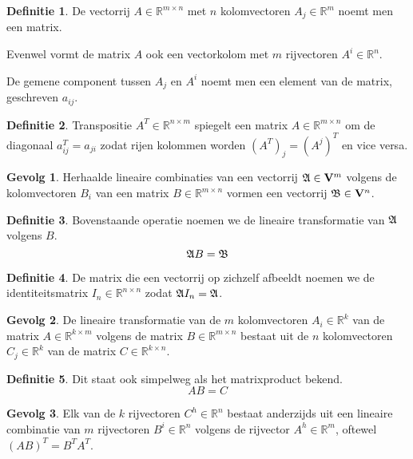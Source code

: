 \documentclass{amsart}
\theoremstyle{definition}
\newtheorem{dfn}{Definitie}[section]
\newtheorem{csq}{Gevolg}[section]
\newcommand{\realnums}{\mathbb{R}}
\newcommand{\realn}[1][n]{\realnums^{#1}}
\newcommand{\realmx}[2][n]{\realn[#2 \times #1]}
\newcommand{\realnxn}{\realmx{n}}
\newcommand{\realmxn}{\realmx{m}}
\newcommand{\vecspace}[1][v]{\mathrm{\mathbf{\MakeUppercase#1}}}
\newcommand{\vecspacen}[1][n]{\vecspace^#1}
\newcommand{\vecrow}[1][a]{\mathfrak{\MakeUppercase{#1}}}
\begin{document}
\begin{dfn}
	De vectorrij $A \in \realn[m \times n]$ met $n$ kolomvectoren $A_{j} \in \realn[m]$ noemt men een matrix.

	Evenwel vormt de matrix $A$ ook een vectorkolom met $m$ rijvectoren $A^i \in \realn$.

	De gemene component tussen $A_j$ en $A^i$ noemt men een element van de matrix, geschreven $a_{ij}$.
\end{dfn}

\begin{dfn}
	Transpositie $A^T \in \realmx[m]{n}$ spiegelt een matrix $A \in \realmxn$ om de diagonaal $a^T_{ij} = a_{ji}$ zodat rijen kolommen worden $(A^T)_j = (A^j)^T$ en vice versa.
\end{dfn}

\begin{csq}
	Herhaalde lineaire combinaties van een vectorrij $\vecrow \in \vecspacen[m]$ volgens de kolomvectoren $B_i$ van een matrix $B \in \realmxn$ vormen een vectorrij $\vecrow[b] \in \vecspacen$.
\end{csq}

\begin{dfn}
	Bovenstaande operatie noemen we de lineaire transformatie van $\vecrow$ volgens $B$.
	\begin{equation*}
		\vecrow B = \vecrow[b]
	\end{equation*}
\end{dfn}

\begin{dfn}
	De matrix die een vectorrij op zichzelf afbeeldt noemen we de identiteitsmatrix $I_n \in \realnxn$ zodat $\vecrow I_n = \vecrow$.
\end{dfn}

\begin{csq}
	De lineaire transformatie van de $m$ kolomvectoren $A_i \in \realn[k]$ van de matrix $A \in \realmx[m]{k}$ volgens de matrix $B \in \realmxn$ bestaat uit de $n$ kolomvectoren $C_j \in \realn[k]$ van de matrix $C \in \realmx[n]{k}$.
\end{csq}

\begin{dfn}
	Dit staat ook simpelweg als het matrixproduct bekend.
	\begin{equation*}
		AB = C
	\end{equation*}
\end{dfn}

\begin{csq}
	Elk van de $k$ rijvectoren $C^h \in \realn$ bestaat anderzijds uit een lineaire combinatie van $m$ rijvectoren $B^i \in \realn$ volgens de rijvector $A^h \in \realn[m]$, oftewel $(AB)^T = B^TA^T$.
\end{csq}
\end{document}
